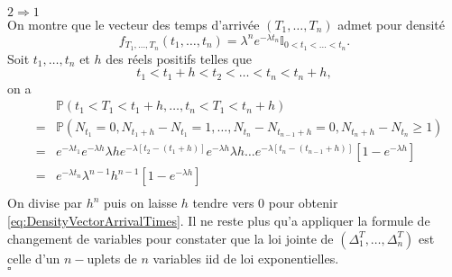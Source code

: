 \documentclass[8pt,notheorems]{beamer}
\theoremstyle{definition}
\theoremstyle{example}
\theoremstyle{mystyle}
\theoremstyle{plain}
\begin{document}
\begin{frame}[allowframebreaks]
\underline{$2 \Rightarrow 1$}\\
On montre que le vecteur des temps d'arrivée $(T_1,\ldots, T_n)$ admet pour densité
\begin{equation}\label{eq:DensityVectorArrivalTimes}
f_{T_1,\ldots, T_n}(t_1,\ldots, t_n)=\lambda^n e^{-\lambda t_n}\mathbb{I}_{0< t_1<\ldots<t_n}.
\end{equation}
Soit $t_1,\ldots, t_n$ et $h$ des réels positifs telles que
$$t_1<t_1+h<t_2<\ldots<t_n<t_n+h,$$ on a
\begin{eqnarray*}
&&\mathbb{P}(t_1<T_1<t_1+h,\ldots,t_n<T_1<t_n+h)\\
&=&\mathbb{P}(N_{t_1}=0,N_{t_1+h}-N_{t_1}=1,\ldots,N_{t_n}-N_{t_{n-1}+h}=0,N_{t_n+h}-N_{t_n}\geq 1)\\
&=&e^{-\lambda t_1}e^{-\lambda h}\lambda h e^{-\lambda [t_2-(t_1+h)]}e^{-\lambda h}\lambda h\ldots e^{-\lambda [t_n-(t_{n-1}+h)]}[1-e^{-\lambda h}] \\
&=&e^{-\lambda t_n}\lambda^{n-1}h^{n-1}[1-e^{-\lambda h}]\\
\end{eqnarray*}
On divise par $h^{n}$ puis on laisse $h$ tendre vers $0$ pour obtenir \eqref{eq:DensityVectorArrivalTimes}. Il ne reste plus qu'a appliquer la formule de changement de variables pour constater que la loi jointe de $(\Delta^{T}_1, \ldots, \Delta^{T}_n)$ est celle d'un $n-$uplets de $n$ variables iid de loi exponentielles.\\
 $\square$

\end{frame}
\end{document}
